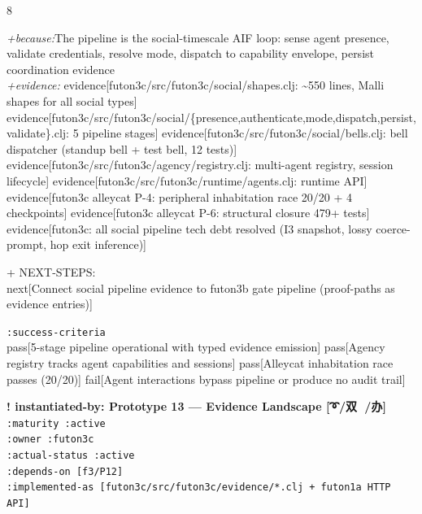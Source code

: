 \documentclass[landscape]{article}
\newcommand{\flexitag}[1]{\textcolor[gray]{0.35}{\textit{#1}}}
\newenvironment{devmapactive}{%
  \def\FrameCommand{\colorbox{devmapactivebg}}%
  \setlength{\fboxsep}{2pt}%
  \MakeFramed{\advance\hsize-\width \FrameRestore}%
}{\endMakeFramed}
\begin{document}
\begin{paracol}{8}
\begin{devmapactive}
  \flexitag{+because:}The pipeline is the social-timescale AIF loop: sense agent presence, validate credentials, resolve mode, dispatch to capability envelope, persist coordination evidence\\
  \flexitag{+evidence:} evidence[futon3c/src/futon3c/social/shapes.clj: \textasciitilde{}550 lines, Malli shapes for all social types] evidence[futon3c/src/futon3c/social/\{presence,authenticate,mode,dispatch,persist,validate\}.clj: 5 pipeline stages] evidence[futon3c/src/futon3c/social/bells.clj: bell dispatcher (standup bell + test bell, 12 tests)] evidence[futon3c/src/futon3c/agency/registry.clj: multi-agent registry, session lifecycle] evidence[futon3c/src/futon3c/runtime/agents.clj: runtime API] evidence[futon3c alleycat P-4: peripheral inhabitation race 20/20 + 4 checkpoints] evidence[futon3c alleycat P-6: structural closure 479+ tests] evidence[futon3c: all social pipeline tech debt resolved (I3 snapshot, lossy coerce-prompt, hop exit inference)]\\
\par
  + NEXT-STEPS:\\
    next[Connect social pipeline evidence to futon3b gate pipeline (proof-paths as evidence entries)]\\
\par
  \texttt{:\allowbreak{}success-\allowbreak{}criteria}\\
    pass[5-stage pipeline operational with typed evidence emission] pass[Agency registry tracks agent capabilities and sessions] pass[Alleycat inhabitation race passes (20/20)] fail[Agent interactions bypass pipeline or produce no audit trail]\\
\par
\par
\end{devmapactive}
\begin{devmapactive}
\textbf{! instantiated-by: Prototype 13 — Evidence Landscape [➰/双 🍍/办]}\\
  \texttt{:\allowbreak{}maturity :\allowbreak{}active}\\
  \texttt{:\allowbreak{}owner :\allowbreak{}futon3c}\\
  \texttt{:\allowbreak{}actual-\allowbreak{}status :\allowbreak{}active}\\
  \texttt{:\allowbreak{}depends-\allowbreak{}on [f3/\allowbreak{}P12]}\\
  \texttt{:\allowbreak{}implemented-\allowbreak{}as [futon3c/\allowbreak{}src/\allowbreak{}futon3c/\allowbreak{}evidence/\allowbreak{}*.clj +\allowbreak{} futon1a HTTP API]}\\

\end{devmapactive}
\end{paracol}
\end{document}
